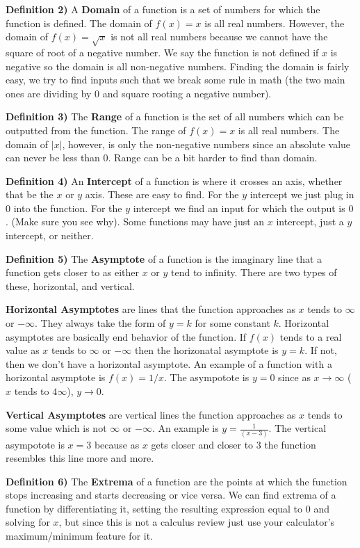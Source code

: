 \documentclass[a4paper]{article}
\begin{document}
\textbf{Definition 2)} A \textbf{Domain} of a function is a set of numbers for which the function is defined. The domain of $f(x)=x$ is all real numbers. However, the domain of $f(x)=\sqrt{x}$ is not all real numbers because we cannot have the square of root of a negative number. We say the function is not defined if $x$ is negative so the domain is all non-negative numbers. Finding the domain is fairly easy, we try to find inputs such that we break some rule in math (the two main ones are dividing by $0$ and square rooting a negative number).

\textbf{Definition 3)} The \textbf{Range} of a function is the set of all numbers which can be outputted from the function. The range of $f(x)=x$ is all real numbers. The domain of $|x|$, however, is only the non-negative numbers since an absolute value can never be less than $0$. Range can be a bit harder to find than domain.

\textbf{Definition 4)} An \textbf{Intercept} of a function is where it crosses an axis, whether that be the $x$ or $y$ axis. These are easy to find. For the $y$ intercept we just plug in $0$ into the function. For the $y$ intercept we find an input for which the output is $0$. (Make sure you see why). Some functions may have just an $x$ intercept, just a $y$ intercept, or neither.

\textbf{Definition 5)} The \textbf{Asymptote} of a function is the imaginary line that a function gets closer to as either $x$ or $y$ tend to infinity. There are two types of these, horizontal, and vertical.

\textbf{Horizontal Asymptotes} are lines that the function approaches as $x$ tends to $\infty$ or $-\infty$. They always take the form of $y=k$ for some constant $k$. Horizontal asymptotes are basically end behavior of the function. If $f(x)$ tends to a real value as $x$ tends to $\infty$ or $-\infty$ then the horizonatal asymptote is $y=k$. If not, then we don't have a horizontal asymptote. An example of a function with a horizontal asymptote is $f(x)=1/x$. The asympotote is $y=0$ since as $x \rightarrow \infty$ ($x$ tends to $4\infty$), $y \rightarrow 0$.

\textbf{Vertical Asymptotes} are vertical lines the function approaches as $x$ tends to some value which is not $\infty$ or $-\infty$. An example is $y=\frac{1}{(x-3)}$. The vertical asympotote is $x=3$ because as $x$ gets closer and closer to $3$ the function resembles this line more and more.

\textbf{Definition 6)} The \textbf{Extrema} of a function are the points at which the function stops increasing and starts decreasing or vice versa. We can find extrema of a function by differentiating it, setting the resulting expression equal to $0$ and solving for $x$, but since this is not a calculus review just use your calculator's maximum/minimum feature for it.
\end{document}
